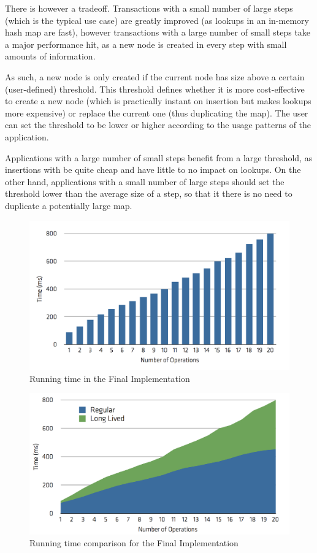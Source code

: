 There is however a tradeoff. Transactions with a small number of large
steps (which is the typical use case) are greatly improved (as lookups
in an in-memory hash map are fast), however transactions with a large
number of small steps take a major performance hit, as a new node is
created in every step with small amounts of information.

As such, a new node is only created if the current node has size above
a certain (user-defined) threshold. This threshold defines whether it
is more cost-effective to create a new node (which is practically
instant on insertion but makes lookups more expensive) or replace the
current one (thus duplicating the map). The user can set the threshold
to be lower or higher according to the usage patterns of the
application.

Applications with a large number of small steps benefit from a large
threshold, as insertions with be quite cheap and have little to no
impact on lookups. On the other hand, applications with a small number
of large steps should set the threshold lower than the average size of
a step, so that it there is no need to duplicate a potentially large
map. 

\begin{figure}
\centering
\includegraphics[width=0.9\linewidth]{time-long-final}
\caption{Running time in the Final Implementation}
\label{fig:runtimeFinal}
\end{figure}

\begin{figure}
\centering
\includegraphics[width=0.9\linewidth]{comparison-final}
\caption{Running time comparison for the Final Implementation}
\label{fig:comparisonFinal}
\end{figure}


